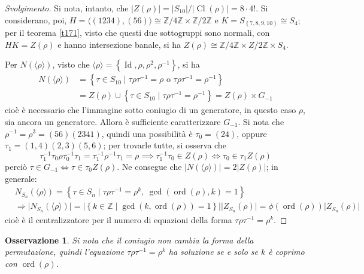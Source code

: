 \documentclass[11pt]{article}
\theoremstyle{style}
\newtheorem{osservazione}{Osservazione}[section]
\newenvironment{svolgimento}{\renewcommand\qedsymbol{$\blacksquare$}\begin{proof}[Svolgimento]}{\end{proof}}
\numberwithin{equation}{subsection}
\begin{document}
\begin{svolgimento}
	Si nota, intanto, che $\lvert Z(\rho ) \rvert = \lvert S_{10} \rvert / \lvert \operatorname{Cl} (\rho ) \rvert = 8 \cdot 4!$.
	Si considerano, poi, $H = \langle (1234),(56) \rangle\cong \mathbb{Z}/4\mathbb{Z} \times \mathbb{Z}/2\mathbb{Z}$ e $K = S_{\left\{ 7,8,9,10 \right\} } \cong S_4$; per il teorema \ref{t171}, visto che questi due sottogruppi sono normali, con $HK = Z(\rho )$ e hanno intersezione banale, si ha $Z(\rho ) \cong \mathbb{Z}/4\mathbb{Z} \times Z / 2\mathbb{Z} \times S_4$.

	Per $N(\langle \rho  \rangle)$, visto che $\langle \rho  \rangle=\left\{ \operatorname{Id} , \rho ,\rho ^2, \rho ^{-1} \right\} $, si ha
	\[
		\begin{split}
			N(\langle \rho  \rangle) &= \left\{ \tau  \in S_{10}  \mid  \tau \rho \tau ^{-1}= \rho  \text{ o } \tau \rho \tau ^{-1}=\rho ^{-1}\right\} \\
						 &= Z(\rho )\cup \left\{ \tau \in S_{10}  \mid \tau \rho \tau ^{-1}=\rho ^{-1}\right\} = Z(\rho) \times G_{-1}
		\end{split}
	\] 
	cio\`e \`e necessario che l'immagine sotto coniugio di un generatore, in questo caso $\rho $, sia ancora un generatore.
	Allora \`e sufficiente caratterizzare $G_{-1} $.
	Si nota che $\rho ^{-1}= \rho ^{3}= (56)(2341)$, quindi una possibilit\`a \`e $\tau_0 = (24)$, oppure $\tau_1= (1,4)(2,3)(5,6)$; per trovarle tutte, si osserva che
	\[
	\tau _1^{-1}\tau _0 \rho \tau_0 ^{-1}\tau _1 = \tau _1^{-1}\rho ^{-1}\tau _1= \rho \implies \tau _1^{-1}\tau _0 \in Z(\rho ) \iff \tau _0 \in \tau _1 Z(\rho )
	\] 
	perci\`o $\tau \in G_{-1} \iff \tau \in \tau _0 Z(\rho )$. 
	Ne consegue che $\lvert N(\langle \rho  \rangle) \rvert = 2 \lvert Z(\rho ) \rvert $; in generale:
	\begin{equation*}
		\begin{split}
			&N_{S_n} (\langle \rho  \rangle) = \left\{ \tau  \in S_n  \mid \tau \rho \tau ^{-1}=\rho ^{k}, \ \operatorname{gcd}(\operatorname{ord}(\rho ) ,k) =1 \right\} \\
			&\Rightarrow \lvert N_{S_n} (\langle \rho \rangle ) \rvert = \lvert \left\{ k \in \mathbb{Z} \mid \operatorname{gcd}(k,\operatorname{ord}(\rho ) ) =1 \right\}  \rvert \lvert Z_{S_n} (\rho ) \rvert =\phi (\operatorname{ord}(\rho ) ) \lvert Z_{S_n} (\rho ) \rvert 
		\end{split}
	\end{equation*}
	cio\`e \`e il centralizzatore per il numero di equazioni della forma $\tau \rho \tau ^{-1}= \rho ^k$.
\end{svolgimento}
\begin{osservazione}
	Si nota che il coniugio non cambia la forma della permutazione, quindi l'equazione $\tau \rho \tau ^{-1} = \rho ^k$ ha soluzione se e solo se $k$ \`e coprimo con $\operatorname{ord}(\rho ) $.
\end{osservazione}
\end{document}
